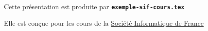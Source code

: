   \item Cette présentation est produite par \texttt{\textbf{exemple-sif-cours.tex}}
  \item Elle est conçue pour les cours de la \href{https://www.societe-informatique-de-france.fr}{Société Informatique de France}
